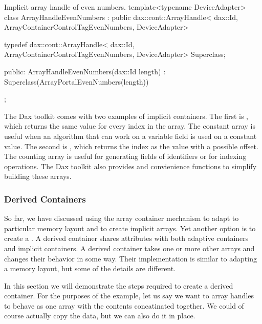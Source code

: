 \begin{daxexample}{Implicit array handle of even numbers.}
template<typename DeviceAdapter>
class ArrayHandleEvenNumbers
    : public dax::cont::ArrayHandle<
                dax::Id, ArrayContainerControlTagEvenNumbers, DeviceAdapter>
{
  typedef dax::cont::ArrayHandle<
                dax::Id, ArrayContainerControlTagEvenNumbers, DeviceAdapter> Superclass;

public:
  ArrayHandleEvenNumbers(dax::Id length)
    : Superclass(ArrayPortalEvenNumbers(length)) {  }
};
\end{daxexample}

The Dax toolkit comes with two examples of implicit containers. The first
is , which returns the same value for every
index in the array. The constant array is useful when an algorithm that can
work on a variable field is used on a constant value. The second is
, which returns the index as the value with a
possible offset. The counting array is useful for generating fields of
identifiers or for indexing operations. The Dax toolkit also provides
 and 
convienience functions to simplify building these arrays.


\subsubsection{Derived Containers}


So far, we have discussed using the array container mechanism to adapt to
particular memory layout and to create implicit arrays. Yet another option
is to create a . A derived container shares
attributes with both adaptive containers and implicit containers. A derived
container takes one or more other arrays and changes their behavior in some
way. Their implementation is similar to adapting a memory layout, but some
of the details are different.

In this section we will demonstrate the steps required to create a derived
container. For the purposes of the example, let us say we want to array
handles to behave as one array with the contents concatinated together. We
could of course actually copy the data, but we can also do it in place.

